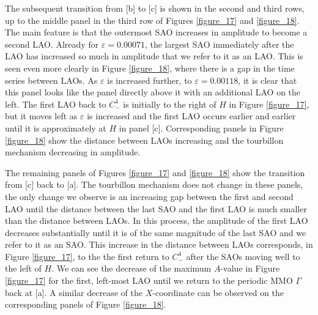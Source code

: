 \documentclass{ws-ijbc}
\begin{document}
The subsequent transition from [b] to [c] is shown in the second and third rows, up to the middle panel in the third row of Figures \ref{figure_17} and \ref{figure_18}.  The main feature is that the outermost SAO increases in amplitude to become a second LAO.  Already for $\varepsilon=0.00071$, the largest SAO immediately after the LAO has increased so much in amplitude that we refer to it as an LAO.  This is seen even more clearly in Figure \ref{figure_18}, where there is a gap in the time series between LAOs.  As $\varepsilon$ is increased further, to $\varepsilon=0.00118$, it is clear that this panel looks like the panel directly above it with an additional LAO on the left.  The first LAO back to $C^4_-$ is initially to the right of $H$ in Figure \ref{figure_17}, but it moves left as $\varepsilon$ is increased and the first LAO occurs earlier and earlier until it is approximately at $H$ in panel [c].  Corresponding panels in Figure \ref{figure_18} show the distance between LAOs increasing and the tourbillon mechanism decreasing in amplitude.

The remaining panels of Figures \ref{figure_17} and \ref{figure_18} show the transition from [c] back to [a].  The tourbillon mechanism does not change in these panels, the only change we observe is an increasing gap between the first and second LAO until the distance between the last SAO and the first LAO is much smaller than the distance between LAOs.  In this process, the amplitude of the first LAO decreases substantially until it is of the same magnitude of the last SAO and we refer to it as an SAO.  This increase in the distance between LAOs corresponds, in Figure \ref{figure_17}, to the the first return to $C^4_-$ after the SAOs moving well to the left of $H$.  We can see the decrease of the maximum $A$-value in Figure \ref{figure_17} for the first, left-most LAO until we return to the periodic MMO $\Gamma$ back at [a].  A similar decrease of the $X$-coordinate can be observed on the corresponding panels of Figure \ref{figure_18}.
\end{document}
